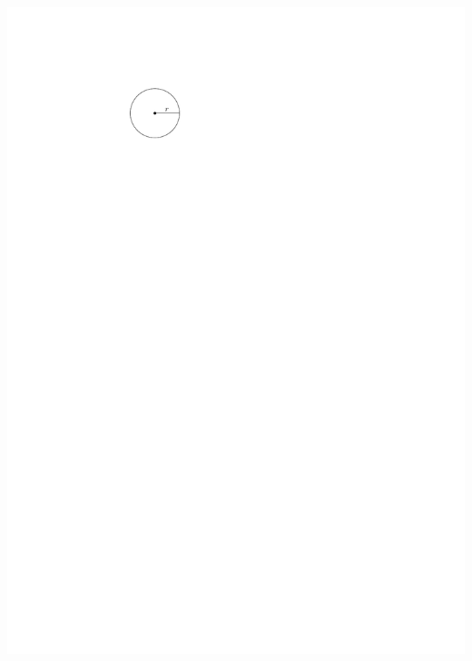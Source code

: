 \documentclass[12pt,twoside]{article}
\begin{document}
\begin{multicols}{2}
\begin{enumerate}
\includegraphics[scale = 0.8]{circle}

\end{enumerate}
\end{multicols}
\end{document}
